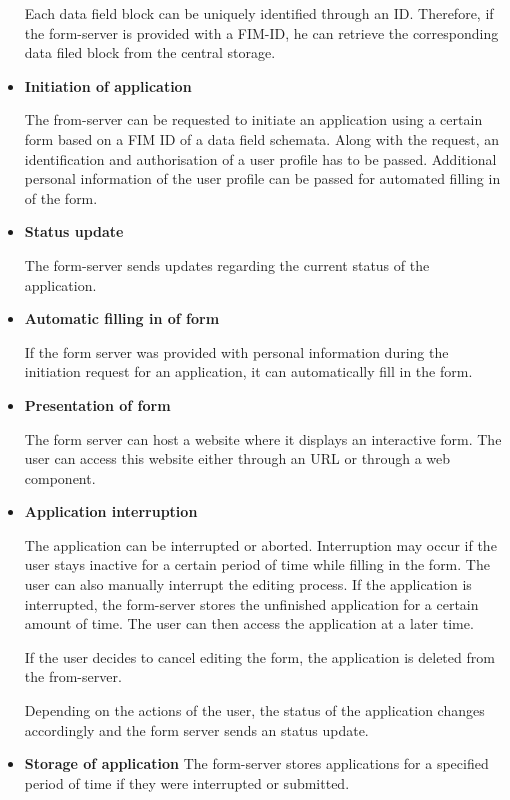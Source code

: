 \documentclass[
     12pt,         %
     a4paper,      %
     BCOR=10mm,version=first,     %
     DIV=14,version=first,        %
     ]{scrreprt}
\begin{document}
\begin{itemize}
    Each data field block can be uniquely identified through an ID. Therefore, if the form-server is provided with a FIM-ID, he can retrieve the corresponding data filed block from the central storage.
    
    \item \textbf{Initiation of application}
    
    The from-server can be requested to initiate an application using a certain form based on a FIM ID of a data field schemata. Along with the request, an identification and authorisation of a user profile has to be passed. Additional personal information of the user profile can be passed for automated filling in of the form.
    
    \item \textbf{Status update}
    
    The form-server sends updates regarding the current status of the application.

    \item \textbf{Automatic filling in of form}
    
    If the form server was provided with personal information during the initiation request for an application, it can automatically fill in the form.
    
    \item \textbf{Presentation of form}
    
    The form server can host a website where it displays an interactive form. The user can access this website either through an URL or through a web component.
    
    \item \textbf{Application interruption}
    
    The application can be interrupted or aborted. Interruption may occur if the user stays inactive for a certain period of time while filling in the form. The user can also manually interrupt the editing process. If the application is interrupted, the form-server stores the unfinished application for a certain amount of time. The user can then access the application at a later time.
    
    If the user decides to cancel editing the form, the application is deleted from the from-server.
    
    Depending on the actions of the user, the status of the application changes accordingly and the form server sends an status update.
    
    \item \textbf{Storage of application}
    The form-server stores applications for a specified period of time if they were interrupted or submitted.
    

\end{itemize}
\end{document}
